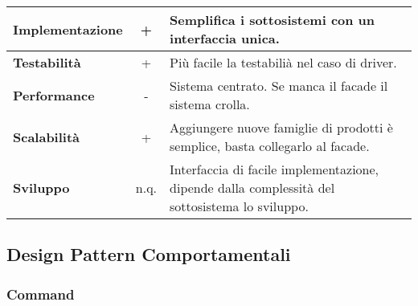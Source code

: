 {{{\begin{itemize}
{\begin{tabular}{|l|c|l|}
						\hline
						\textbf{Implementazione} & + & Semplifica i sottosistemi con un interfaccia unica. \\
						\hline
						\textbf{Testabilità} & + & Più facile la testabilià nel caso di driver. \\
						\hline
						\textbf{Performance} & - & Sistema centrato. Se manca il facade il sistema crolla. \\
						\hline
						\textbf{Scalabilità} & + & Aggiungere nuove famiglie di prodotti è semplice, basta collegarlo al facade. \\
						\hline
						\textbf{Sviluppo} & n.q. & Interfaccia di facile implementazione, dipende dalla complessità del sottosistema lo sviluppo. \\
						\hline
					\end{tabular}
				}
			\end{itemize}
		}
	}
	\subsection{Design Pattern Comportamentali}{
		\subsubsection{Command}{
		
		}
	}
}